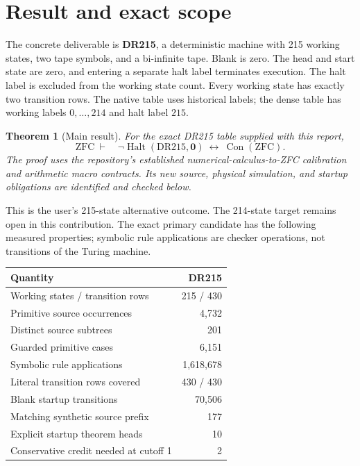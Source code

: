 \documentclass[11pt,a4paper]{article}
\newtheorem{theorem}{Theorem}[section]
\theoremstyle{definition}
\newcommand{\Halt}{\operatorname{Halt}}
\newcommand{\Con}{\operatorname{Con}}
\newcommand{\blank}{\mathbf 0}
\numberwithin{equation}{section}
\begin{document}
\hypersetup{pageanchor=true}
\begingroup
\small
\setlength{\parskip}{0pt}
\tableofcontents
\endgroup
\newpage
{}

\section{Result and exact scope}
\label{sec:result}

The concrete deliverable is \textbf{DR215}, a deterministic machine with
215 working states, two tape symbols, and a bi-infinite tape. Blank is
zero. The head and start state are zero, and entering a separate halt
label terminates execution. The halt label is excluded from the working
state count. Every working state has exactly two transition rows. The
native table uses historical labels; the dense table has working labels
$0,\ldots,214$ and halt label $215$.

\begin{theorem}[Main result]
\label{thm:main}
For the exact DR215 table supplied with this report,
\[
 \mathrm{ZFC}\ \vdash\quad
 \neg\Halt(\mathrm{DR215},\blank)
 \ \longleftrightarrow\ \Con(\mathrm{ZFC}).
\]
The proof uses the repository's established numerical-calculus-to-ZFC
calibration and arithmetic macro contracts. Its new source, physical
simulation, and startup obligations are identified and checked below.
\end{theorem}

This is the user's 215-state alternative outcome. The 214-state target
remains open in this contribution. The exact primary candidate has the
following measured properties; symbolic rule applications are checker
operations, not transitions of the Turing machine.

\begin{center}
\begin{tabular}{lr}
\toprule
Quantity & DR215\\
\midrule
Working states / transition rows & 215 / 430\\
Primitive source occurrences & 4,732\\
Distinct source subtrees & 201\\
Guarded primitive cases & 6,151\\
Symbolic rule applications & 1,618,678\\
Literal transition rows covered & 430 / 430\\
Blank startup transitions & 70,506\\
Matching synthetic source prefix & 177\\
Explicit startup theorem heads & 10\\
Conservative credit needed at cutoff 1 & 2\\
\bottomrule
\end{tabular}
\end{center}
\end{document}
